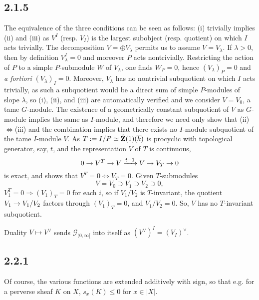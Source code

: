 \documentclass[deligne.tex]{subfiles}
\begin{document}
\subsection*{2.1.5} The equivalence of the three conditions can be seen as
follows: (i) trivially implies (ii) and (iii) as $V^I$ (resp. $V_I$) is the
largest subobject (resp. quotient) on which $I$ acts trivially.
The decomposition $V=\oplus V_\lambda$ permits us to assume $V=V_\lambda$.
If $\lambda>0$, then by definition $V_\lambda^I=0$ and moreover $P$ acts
nontrivially. Restricting the action of $P$ to a simple $P$-submodule $W$ 
of $V_\lambda$, one finds $W_P=0$, hence $(V_{\lambda})_P=0$ and
\emph{a fortiori} $(V_{\lambda})_I=0$. Moreover, $V_\lambda$ has no
nontrivial subquotient on which $I$ acts trivially, as such a subquotient
would be a direct sum of simple $P$-modules of slope $\lambda$, so
(i), (ii), and (iii) are automatically verified and we consider $V=V_0$,
a tame $G$-module. The existence of a geometrically constant subquotient of
$V$ as $G$-module implies the same as $I$-module, and therefore we need
only show that (ii)$\Leftrightarrow$(iii) and the combination implies that
there exists no $I$-module subquotient of the tame $I$-module $V$.
As $T:=I/P\simeq\hat{\mathbf{Z}}(1)(\overline k)$ is procyclic with topological
generator, say, $t$, and the representation $V$ of $T$ is continuous,
\begin{equation*}
	0\rightarrow V^T\rightarrow V\xrightarrow{t-1}V\rightarrow V_T\rightarrow0
\end{equation*}
is exact, and shows that $V^T=0\Leftrightarrow V_T=0$.
Given $T$-submodules
\begin{equation*}
	V=V_0\supset V_1\supset V_2\supset0,
\end{equation*}
$V_1^T=0\Rightarrow (V_1)_T=0$ for each $i$, so if $V_1/V_2$ is
$T$-invariant, the quotient $V_1\rightarrow V_1/V_2$ factors through $(V_1)_T=0$,
and $V_1/V_2=0$. So, $V$ has no $T$-invariant subquotient.

Duality $V\mapsto V^\vee$ sends $\mathscr G_{(0,\infty[}$ into itself
as $(V^\vee)^I=(V_I)^\vee$.

\subsection*{2.2.1}\label{laumon:2.2.1}
Of course, the various functions are extended additively with sign, so that
e.g. for a perverse sheaf $K$ on $X$, $s_x(K)\leq0$ for $x\in|X|$.
\end{document}
